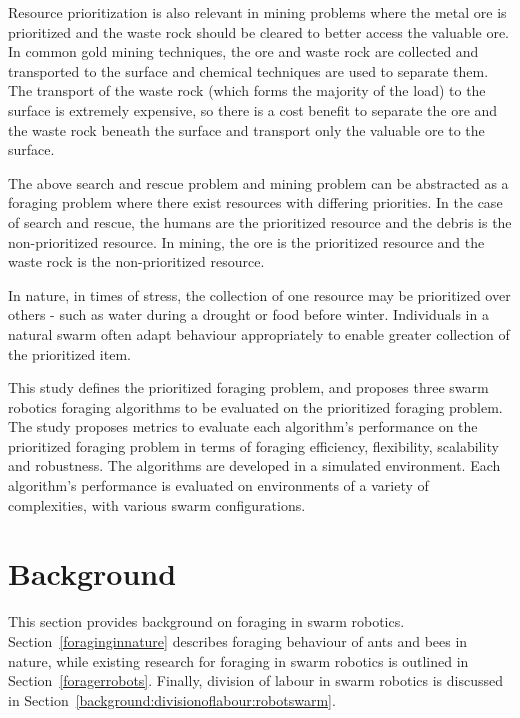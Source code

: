 \documentclass[preprint,12pt]{elsarticle}
\begin{document}
Resource prioritization is also relevant in mining problems where the metal ore is prioritized and the waste rock should be cleared to better access the valuable ore. In common gold mining techniques, the ore and waste rock are collected and transported to the surface and chemical techniques are used to separate them. The transport of the waste rock (which forms the majority of the load) to the surface is extremely expensive, so there is a cost benefit to separate the ore and the waste rock beneath the surface and transport only the valuable ore to the surface.

The above search and rescue problem and mining problem can be abstracted as a foraging problem where there exist resources with differing priorities. In the case of search and rescue, the humans are the prioritized resource and the debris is the non-prioritized resource. In mining, the ore is the prioritized resource and the waste rock is the non-prioritized resource. 

In nature, in times of stress, the collection of one resource may be prioritized over others - such as water during a drought or food before winter. Individuals in a natural swarm often adapt behaviour appropriately to enable greater collection of the prioritized item.

This study defines the prioritized foraging problem, and proposes three swarm robotics foraging algorithms to be evaluated on the prioritized foraging problem. The study proposes metrics to evaluate each algorithm's performance on the prioritized foraging problem in terms of foraging efficiency, flexibility, scalability and robustness. The algorithms are developed in a simulated environment. Each algorithm's performance is evaluated on environments of a variety of complexities, with various swarm configurations.

\section{Background}
\label{background}

This section provides background on foraging in swarm robotics.  Section~\ref{foraginginnature} describes foraging behaviour of ants and bees in nature, while existing research for foraging in swarm robotics is outlined in Section~\ref{foragerrobots}. Finally, division of labour in swarm robotics is discussed in  Section~\ref{background:divisionoflabour:robotswarm}.
\end{document}

